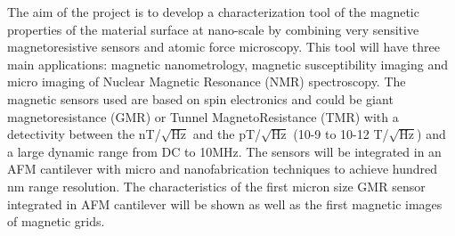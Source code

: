 The aim of the project is to develop a characterization tool of the magnetic properties of the material surface at nano-scale by combining very sensitive magnetoresistive sensors and atomic force microscopy. This tool will have three main applications: magnetic nanometrology, magnetic susceptibility imaging and micro imaging of Nuclear Magnetic Resonance (NMR) spectroscopy.  
The magnetic sensors used are based on spin electronics and could be giant magnetoresistance (GMR) or Tunnel MagnetoResistance (TMR) with a detectivity between the nT/$\sqrt{\text{Hz}}$ and the pT/$\sqrt{\text{Hz}}$ (10-9 to 10-12 T/$\sqrt{\text{Hz}}$) and a large dynamic range from DC to 10MHz. The sensors will be integrated in an AFM cantilever with micro and nanofabrication techniques to achieve hundred nm range resolution. 
The characteristics of the first micron size GMR sensor integrated in AFM cantilever will be shown as well as the first magnetic images of magnetic grids.
